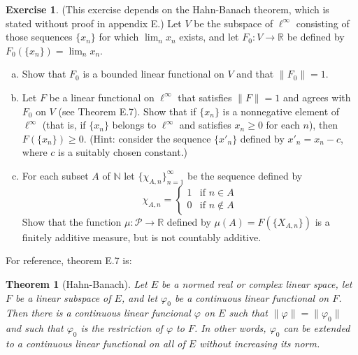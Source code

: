 \documentclass[11pt,a4paper,twoside]{article}
\theoremstyle{definition}
\newcounter{excounter}
\newtheorem{exercise}[excounter]{Exercise}
\theoremstyle{plain}
\newtheorem*{theorem}{Theorem}
\begin{document}
\begin{exercise}

  (This exercise depends on the Hahn-Banach theorem, which is stated without proof
  in appendix E.) Let $V$ be the subspace of $\ell^\infty$ consisting of those
  sequences $\{ x_n \}$ for which $\lim_n x_n$ exists, and let $F_0\colon V\to\mathbb{R}$
  be defined by $F_0(\{x_n\})=\lim_n x_n$.
  \begin{enumerate}[(a)]

    \item Show that $F_0$ is a bounded linear functional on $V$ and that $\| F_0 \| = 1$.

    \item Let $F$ be a linear functional on $\ell^\infty$ that satisfies $\| F \| = 1$ and
      agrees with $F_0$ on $V$ (see Theorem E.7). Show that if $\{ x_n \}$ is a nonnegative
      element of $\ell^\infty$ (that is, if $\{ x_n \}$ belongs to $\ell^\infty$
      and satisfies $x_n \geq 0$ for each $n$), then $F ( \{ x_n \} ) \geq 0$. (Hint: consider
      the sequence $\{ x'_n \}$ defined by $x'_n = x_n - c$, where $c$ is a suitably chosen constant.)

    \item For each subset $A$ of $\mathbb{N}$ let $\{ \chi_{A, n} \}_{n = 1}^\infty$ be the sequence
      defined by
      \begin{equation*}
        \chi_{A, n} = \begin{cases}
          1 &\text{if } n \in A \\
          0 &\text{if } n \notin A
        \end{cases}
      \end{equation*}
      Show that the function $\mu \colon \mathscr{P} \to \mathbb{R}$ defined by $\mu ( A ) = F ( \{ X_{A, n} \} )$
      is a finitely additive measure, but is not countably additive.

  \end{enumerate}

\end{exercise}

For reference, theorem E.7 is:
\bigskip
\begin{theorem}[Hahn-Banach]
  Let $E$ be a normed real or complex linear space, let $F$ be a linear subspace of $E$, and let $\varphi_0$ be
  a continuous linear functional on $F$. Then there is a continuous linear funcional $\varphi$ on $E$ such that
  $\| \varphi \| = \| \varphi_0 \|$ and such that $\varphi_0$ is the restriction of $\varphi$ to $F$. In other words,
  $\varphi_0$ can be extended to a continuous linear functional on all of $E$ without increasing its norm.
\end{theorem}
\end{document}

